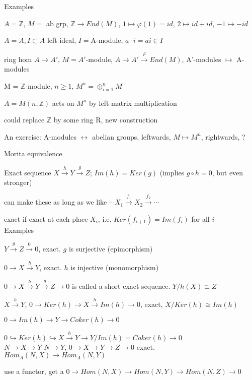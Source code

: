 \documentclass[12pt]{article}
\begin{document}
\noindent
Examples

\noindent
$A = \mathds{Z}$, $M =$ ab grp, $\mathds{Z} \to End(M)$, $1 \mapsto \varphi(1) = id$, $2 \mapsto id + id$, $-1 \mapsto -id$

\noindent
$A = A, I \subset A$ left ideal, $I = $A-module, $a \cdot i = ai \in I$

\noindent
ring hom $A \to A'$, $M = A'$-module, $A \to A' \xrightarrow{\varphi} End(M)$, A'-modules $\mapsto$ A-modules

\noindent
M = $\mathds{Z}$-module, $n \geq 1$, $M^n = \oplus_{i = 1}^n M$

$A = M(n, \mathds{Z})$ acts on $M^n$ by left matrix multiplication

could replace $\mathds{Z}$ by some ring R, new construction

An exercise: A-modules $\leftrightarrow$ abelian groups, leftwards, $M \mapsto M^n$, rightwards, ?

Morita equivalence

\noindent
Exact sequence $X \xrightarrow{h} Y \xrightarrow{g} Z$; $Im(h) = Ker(g)$ (implies $g \circ h = 0$, but even stronger)

can make these as long as we like $\cdots X_1 \xrightarrow{f_1} X_2 \xrightarrow{f_2} \cdots$

exact if exact at each place $X_i$, i.e. $Ker(f_{i + 1}) = Im(f_i)$ for all $i$\\

\noindent
Examples

\noindent
$Y \xrightarrow{g} Z \xrightarrow{0} 0$, exact.  $g$ is surjective (epimorphism)

\noindent
$0 \to X \xrightarrow{h} Y$, exact.  $h$ is injective (monomorphism)

\noindent
$0 \to X \xrightarrow{h} Y \xrightarrow{g} Z \to 0$ is called a short exact sequence.  $Y/h(X) \cong Z$

\noindent
$X \xrightarrow{h} Y$, $0 \to Ker(h) \to X \xrightarrow{h} Im(h) \to 0$, exact, $X/Ker(h) \cong Im(h)$

\noindent
$0 \to Im(h) \to Y \to Coker(h) \to 0$

\noindent
$0 \hookrightarrow Ker(h) \hookrightarrow X \xrightarrow{h} Y \to Y/Im(h) = Coker(h) \to 0$\\

\noindent
$N \to X \to Y$ $N \to Y$, $0 \to X \to Y \to Z \to 0$ exact.  $Hom_A(N, X) \to Hom_A(N, Y)$

use a functor, get a $0 \to Hom(N, X) \to Hom(N, Y) \to Hom(N, Z) \to 0$
\end{document}
